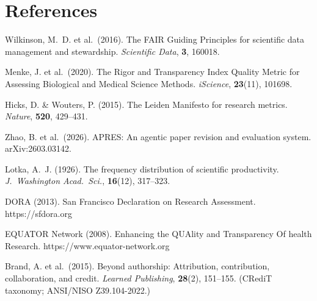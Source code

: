 \documentclass[11pt, a4paper]{article}
\begin{document}
\section*{References}

\begin{enumerate}[nosep, label={[\arabic*]}]
\item Wilkinson, M.~D. et al.\ (2016). The FAIR Guiding Principles for scientific data management and stewardship. \textit{Scientific Data}, \textbf{3}, 160018.
\item Menke, J. et al.\ (2020). The Rigor and Transparency Index Quality Metric for Assessing Biological and Medical Science Methods. \textit{iScience}, \textbf{23}(11), 101698.
\item Hicks, D. \& Wouters, P. (2015). The Leiden Manifesto for research metrics. \textit{Nature}, \textbf{520}, 429--431.
\item Zhao, B. et al.\ (2026). APRES: An agentic paper revision and evaluation system. arXiv:2603.03142.
\item Lotka, A.~J. (1926). The frequency distribution of scientific productivity. \textit{J.\ Washington Acad.\ Sci.}, \textbf{16}(12), 317--323.
\item DORA (2013). San Francisco Declaration on Research Assessment. https://sfdora.org
\item EQUATOR Network (2008). Enhancing the QUAlity and Transparency Of health Research. https://www.equator-network.org
\item Brand, A. et al.\ (2015). Beyond authorship: Attribution, contribution, collaboration, and credit. \textit{Learned Publishing}, \textbf{28}(2), 151--155. (CRediT taxonomy; ANSI/NISO Z39.104-2022.)
\end{enumerate}
\end{document}
